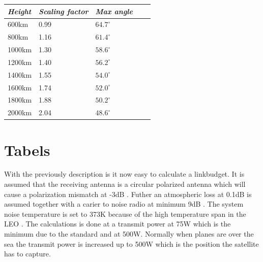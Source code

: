 \begin{center}
 \label{tab:scaling}
  \begin{tabular}{ l  l  l  l  l}
    \hline
   \textit{Height} & \textit{Scaling factor} & \textit{Max angle} \\ \hline
    600km & 0.99	& $64.7^\circ$   \\ \hline
    800km & 1.16	& $61.4^\circ$   \\ \hline
    1000km & 1.30	& $58.6^\circ$   \\ \hline
    1200km & 1.40	& $56.2^\circ$   \\ \hline
    1400km & 1.55	& $54.0^\circ$   \\ \hline
    1600km & 1.74	& $52.0^\circ$   \\ \hline
    1800km & 1.88	& $50.2^\circ$   \\ \hline
    2000km & 2.04	& $48.6^\circ$   \\ \hline
\end{tabular}
\end{center}


\section{Tabels}
With the previously description is it now easy to calculate a linkbudget. It is assumed that the receiving antenna is a circular polarized antenna which will cause a polarization mismatch at -3dB \citep{Balanis2005}. Futher an atmospheric loss at 0.1dB is assumed together with a carier to noise radio at minimum 9dB \citep{itu2017}. The system noise temperature is set to 373K because of the high temperature span in the LEO \citep{FlyingLab}. The calculations is done at a transmit power at 75W which is the minimum due to the standard and at 500W. Normally when planes are over the sea the transmit power is increased up to 500W which is the position the satellite has to capture.    
 
